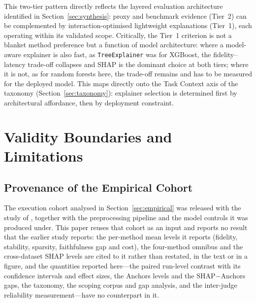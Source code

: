 \documentclass[10pt]{article}
\begin{document}
This two-tier pattern directly reflects the layered evaluation
architecture identified in Section~\ref{sec:synthesis}: proxy and
benchmark evidence (Tier~2) can be complemented by interaction-optimised
lightweight explanations (Tier~1), each operating within its validated
scope.  Critically, the Tier~1 criterion is not a blanket method preference
but a function of model architecture: where a model-aware explainer is
also fast, as \texttt{TreeExplainer} was for XGBoost, the fidelity--latency
trade-off collapses and SHAP is the dominant choice at both tiers; where it
is not, as for random forests here, the trade-off remains and has to be
measured for the deployed model.  This maps directly onto the Task Context axis of the taxonomy
(Section~\ref{sec:taxonomy}): explainer selection is determined first by
architectural affordance, then by deployment constraint.

\section{Validity Boundaries and Limitations}
\label{sec:validity}

\subsection{Provenance of the Empirical Cohort}
\label{sec:prior_publication}

The execution cohort analysed in Section~\ref{sec:empirical} was released
with the study of \citet{herrera2026framework}, together with the
preprocessing pipeline and the model controls it was produced under. This
paper reuses that cohort as an input and reports no result that the earlier
study reports: the per-method mean levels it reports (fidelity, stability,
sparsity, faithfulness gap and cost), the four-method omnibus and the
cross-dataset SHAP levels are cited to it rather than restated, in the text
or in a figure, and the quantities reported here---the paired run-level contrast
with its confidence intervals and effect sizes, the Anchors levels and the
SHAP$-$Anchors gaps, the taxonomy, the scoping corpus and gap analysis, and
the inter-judge reliability measurement---have no counterpart in it.
\end{document}
